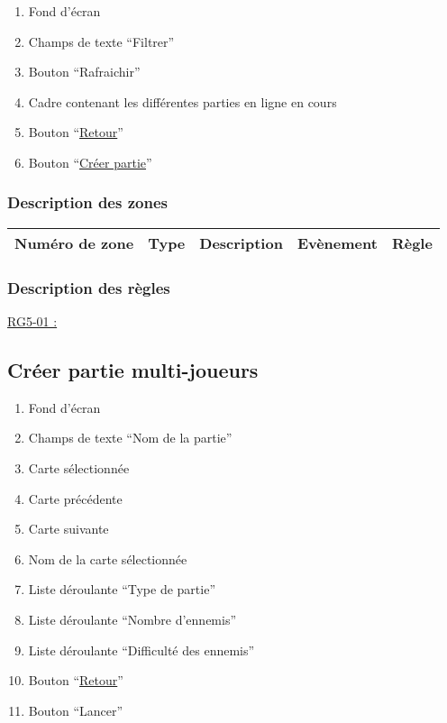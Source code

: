 \documentclass{report}
\begin{document}
		\begin{enumerate}
		  \item Fond d'écran
		  \item Champs de texte ``Filtrer''
		  \item Bouton ``Rafraichir''
		  \item Cadre contenant les différentes parties en ligne en cours
		  \item Bouton ``\hyperlink{Page d'accueil}{Retour}''
		  \item Bouton ``\hyperlink{Creer partie multi-joueurs}{Créer partie}''
		\end{enumerate}

		\subsubsection{Description des zones}

			\begin{tabular}{|c|c|c|c|c|} \hline
				Numéro de zone & Type  & Description & Evènement &	Règle \\\hline
			\end{tabular}

		\subsubsection{Description des règles}

			\underline{RG5-01 :}
				\begin{quote}

				\end{quote}		
	
\newpage

	\subsection{Créer partie multi-joueurs}
	
		\hypertarget{Creer partie multi-joueurs}{}
		\label{Creer partie multi-joueurs}
	
		\begin{center}
			
		\end{center}
		
		\begin{enumerate}
		  \item Fond d'écran
		  \item Champs de texte ``Nom de la partie''
		  \item Carte sélectionnée
		  \item Carte précédente
		  \item Carte suivante
		  \item Nom de la carte sélectionnée
		  \item Liste déroulante ``Type de partie''
		  \item Liste déroulante ``Nombre d'ennemis''
		  \item Liste déroulante ``Difficulté des ennemis''
		  \item Bouton ``\hyperlink{Page d'accueil}{Retour}''
		  \item Bouton ``Lancer'' 
		\end{enumerate}
\end{document}

